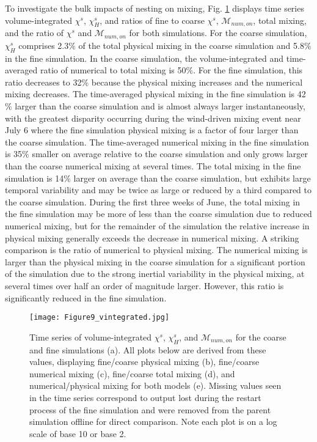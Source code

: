 \documentclass[draft]{agujournal2019}
\begin{document}
To investigate the bulk impacts of nesting on mixing, Fig. \ref{fig:volume-integrated} displays time series volume-integrated $\chi^s$, $\chi_H^s$, and ratios of fine to coarse $\chi^s$, $\mathcal{M}_{num, on}$, total mixing, and the ratio of $\chi^s$ and $\mathcal{M}_{num, on}$ for both simulations. For the coarse simulation, $\chi_H^s$ comprises 2.3$\%$ of the total physical mixing in the coarse simulation and 5.8$\%$ in the fine simulation. In the coarse simulation, the volume-integrated and time-averaged ratio of numerical to total mixing is 50$\%$. For the fine simulation, this ratio decreases to 32$\%$ because the physical mixing increases and the numerical mixing decreases. The time-averaged physical mixing in the fine simulation is 42$\%$ larger than the coarse simulation and is almost always larger instantaneously, with the greatest disparity occurring during the wind-driven mixing event near July 6 where the fine simulation physical mixing is a factor of four larger than the coarse simulation.  The time-averaged numerical mixing in the fine simulation is 35$\%$ smaller on average relative to the coarse simulation and only grows larger than the coarse numerical mixing at several times. The total mixing in the fine simulation is 14$\%$ larger on average than the coarse simulation, but exhibits large temporal variability and may be twice as large or reduced by a third compared to the coarse simulation. During the first three weeks of June, the total mixing in the fine simulation may be more of less than the coarse simulation due to reduced numerical mixing, but for the remainder of the simulation the relative increase in physical mixing generally exceeds the decrease in numerical mixing. A striking comparison is the ratio of numerical to physical mixing. The numerical mixing is larger than the physical mixing in the coarse simulation for a significant portion of the simulation due to the strong inertial variability in the physical mixing, at several times over half an order of magnitude larger. However, this ratio is significantly reduced in the fine simulation. 

\begin{figure}[ht!]
 \centerline{\texttt{[image: Figure9\_vintegrated.jpg]}}
  \caption{Time series of volume-integrated $\chi^s$, $\chi_H^s$,  and $\mathcal{M}_{num, on}$ for the coarse and fine simulations (a). All plots below are derived from these values, displaying fine/coarse physical mixing (b), fine/coarse numerical mixing (c), fine/coarse total mixing (d), and numerical/physical mixing for both models (e). Missing values seen in the time series correspond to output lost during the restart process of the fine simulation and were removed from the parent simulation offline for direct comparison. Note each plot is on a log scale of base 10 or base 2.}
  \label{fig:volume-integrated}
\end{figure}
\end{document}
